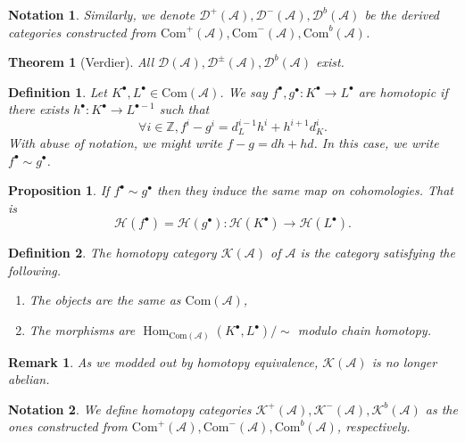 \documentclass[10pt]{article}
\numberwithin{equation}{section}
\newtheorem{theorem}{Theorem} [section]
\newtheorem{proposition}{Proposition}[section]
\newtheorem{definition}{Definition}[section]
\newtheorem{notation}{Notation}[section]
\newtheorem{remark}{Remark}[section]
\DeclareMathOperator{\Hom}{Hom}
\newcommand{\Z}[0]{\mathbb{Z}}
\newcommand{\cK}[0]{\mathcal{K}}
\newcommand{\cH}[0]{\mathcal{H}}
\newcommand{\cD}[0]{\mathcal{D}}
\newcommand{\sA}[0]{\mathscr{A}}
\newcommand{\Com}[0]{\mathrm{Com}}
\begin{document}
\begin{notation}
    Similarly, we denote $\cD^+(\sA),\cD^-(\sA),\cD^b(\sA)$ be the derived categories constructed from $\Com^+(\sA),\Com^-(\sA),\Com^b(\sA)$.
\end{notation}

\begin{theorem}[Verdier]
    All $\cD(\sA),\cD^\pm(\sA),\cD^b(\sA)$ exist.
\end{theorem}

\begin{definition}
    Let $K^\bullet,L^\bullet\in \Com(\sA)$. We say $f^\bullet,g^\bullet:K^\bullet\to L^\bullet$ are homotopic if there exists $h^\bullet:K^\bullet\to L^{\bullet-1}$ such that 
    \begin{equation*}
        \forall i\in\Z, f^i - g^i = d_L^{i-1}h^i+h^{i+1}d_K^i.
    \end{equation*}
    With abuse of notation, we might write $f-g = dh+hd$. In this case, we write $f^\bullet\sim g^\bullet$.
\end{definition}

\begin{proposition}
    If $f^\bullet\sim g^\bullet$ then they induce the same map on cohomologies. That is 
    \begin{equation*}
        \cH(f^\bullet) = \cH(g^\bullet):\cH(K^\bullet)\to \cH(L^\bullet).
    \end{equation*}
\end{proposition}

\begin{definition}
    The homotopy category $\cK(\sA)$ of $\sA$ is the category satisfying the following.
    \begin{enumerate}
        \item The objects are the same as $\Com(\sA)$, 
        \item The morphisms are $\Hom_{\Com(\sA)}(K^\bullet,L^\bullet)/\sim$ modulo chain homotopy.
    \end{enumerate}
\end{definition}

\begin{remark}
    As we modded out by homotopy equivalence, $\cK(\sA)$ is no longer abelian. 
\end{remark}

\begin{notation}
We define homotopy categories $\cK^+(\sA),\cK^-(\sA),\cK^b(\sA)$ as the ones constructed from $\Com^+(\sA),\Com^-(\sA),\Com^b(\sA)$, respectively.
\end{notation}
\end{document}
